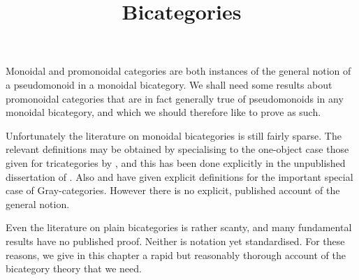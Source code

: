 \documentclass{robinthesisdraft}
\title{Bicategories}
\begin{document}
\maketitle

Monoidal and promonoidal categories are both instances of the
general notion of a pseudomonoid in a monoidal bicategory. We
shall need some results about promonoidal categories that are
in fact generally true of pseudomonoids in any monoidal bicategory,
and which we should therefore like to prove as such.

Unfortunately the literature on monoidal bicategories is still fairly sparse.
The relevant definitions may be obtained by specialising to the one-object
case those given for tricategories by \citet{GPS}, and this has been done
explicitly in the unpublished dissertation of \citet{CarmodyThesis}.
Also \citet{MonBicat} and \citet{HDA1} have given explicit definitions for
the important special case of Gray-categories. However there is no explicit,
published account of the general notion.

Even the literature on plain bicategories is rather scanty, and many
fundamental results have no published proof. Neither is notation
yet standardised. For these reasons, we give in this chapter a rapid
but reasonably thorough account of the bicategory theory that we need.
\end{document}
